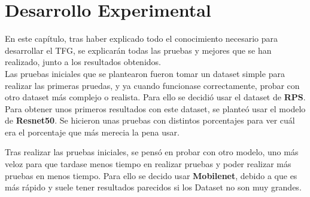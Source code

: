 \chapter{Desarrollo Experimental}\label{ch:desarrollo_experimental}

En este capítulo, tras haber explicado todo el conocimiento necesario para desarrollar el TFG, se explicarán todas las
pruebas y mejores que se han realizado, junto a los resultados obtenidos. \\[6pt]


Las pruebas iniciales que se plantearon fueron tomar un dataset simple para realizar las primeras pruedas, y ya cuando
funcionase correctamente, probar con otro dataset más complejo o realista.
Para ello se decidió usar el dataset de \textbf{RPS}. \\[6pt]

Para obtener unos primeros resultados con este dataset, se planteó usar el modelo de \textbf{Resnet50}.
Se hicieron unas pruebas con distintos porcentajes para ver cuál era el porcentaje que más merecia la pena usar.

\begin{table}[htp]
    \centering
    \caption{}
    \label{tab:initial_generation_resnet}
\end{table}


Tras realizar las pruebas iniciales, se pensó en probar con otro modelo, uno más veloz para que tardase menos tiempo en
realizar pruebas y poder realizar más pruebas en menos tiempo.
Para ello se decido usar \textbf{Mobilenet}, debido a que es más rápido y suele tener resultados parecidos si
los Dataset no son muy grandes.
